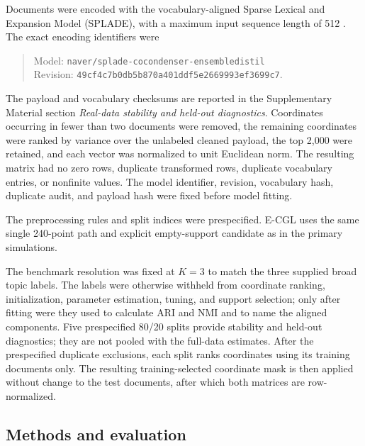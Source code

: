 \documentclass[preprint,12pt,authoryear]{elsarticle}
\begin{document}
Documents were encoded with the vocabulary-aligned Sparse Lexical and
Expansion Model (SPLADE), with a maximum input sequence length of 512
\citep{formal2021splade,formal2022hardnegative}. The exact encoding identifiers
were
\begingroup\small
\begin{quote}\noindent
Model: \texttt{naver/splade-cocondenser-ensembledistil}\\
Revision: \texttt{49cf4c7b0db5b870a401ddf5e2669993ef3699c7}.
\end{quote}
\endgroup
The payload and vocabulary checksums are reported in the Supplementary
Material section \emph{Real-data stability and held-out diagnostics}.
Coordinates occurring in fewer than two documents were removed, the
remaining coordinates were ranked by variance over the unlabeled cleaned
payload, the top 2,000 were retained, and each vector was normalized to unit
Euclidean norm. The resulting matrix had no zero rows, duplicate
transformed rows, duplicate vocabulary entries, or nonfinite values. The
model identifier, revision, vocabulary hash, duplicate audit, and payload hash
were fixed before model fitting.

The preprocessing rules and split indices were prespecified. E-CGL uses the
same single 240-point path and explicit empty-support candidate as in the
primary simulations.

The benchmark resolution was fixed at $K=3$ to match the three supplied broad
topic labels. The labels were otherwise withheld from coordinate ranking,
initialization, parameter estimation, tuning, and support selection; only after
fitting were they used to calculate ARI and NMI and to name the aligned
components.
Five prespecified 80/20 splits provide stability and held-out diagnostics; they
are not pooled with the full-data estimates. After
the prespecified duplicate exclusions, each split ranks coordinates using its
training documents only. The resulting training-selected coordinate mask is
then applied without change to the test documents, after which both matrices
are row-normalized.

\subsection{Methods and evaluation}
\end{document}
